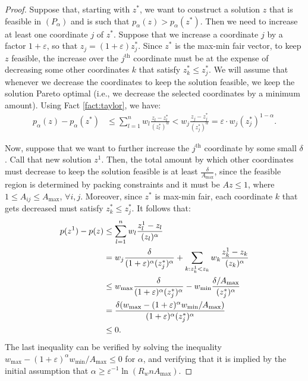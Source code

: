 \documentclass[11pt]{article}
\newcommand{\wratio}{R_w}
\begin{document}
\begin{proof}
Suppose that, starting with $z^*$, we want to construct a solution $z$ that is feasible in $(P_\alpha)$ and is such that $p_\alpha(z) > p_\alpha(z^*)$. Then we need to increase at least one coordinate $j$ of $z^*$. Suppose that we increase a coordinate $j$ by a factor $1+\varepsilon$, so that $z_j = (1+\varepsilon)z_j^*$. Since $z^*$ is the max-min fair vector, to keep $z$ feasible, the increase over the $j^{\text{th}}$ coordinate must be at the expense of decreasing some other coordinates $k$ that satisfy $z_k^* \leq z_j^*$. We will assume that whenever we decrease the coordinates to keep the solution feasible, we keep the solution Pareto optimal (i.e., we decrease the selected coordinates by a minimum amount). Using Fact \ref{fact:taylor}, we have:
\begin{align}
p_\alpha(z) - p_\alpha(z^*) &\leq \sum_{l=1}^n w_l\frac{z_l - z_l^*}{(z_l^*)^{\alpha}}< w_j\frac{z_j - z_j^*}{(z_j^*)^{\alpha}} = {\varepsilon}\cdot w_j(z_j^*)^{1-\alpha}. \label{eq:mmf-part-1}
\end{align}

Now, suppose that we want to further increase the $j^{\text{th}}$ coordinate by some small $\delta$. Call that new solution $z^1$. Then, the total amount by which other coordinates must decrease to keep the solution feasible is at least $\frac{\delta}{A_{\max}}$, since the feasible region is determined by packing constraints and it must be $Az\leq 1$, where $1\leq A_{ij}\leq A_{\max}$, $\forall i, j$. Moreover, since $z^*$ is max-min fair, each coordinate $k$ that gets decreased must satisfy $z_k^* \leq z_j^*$. It follows that:
\begin{align}
p(z^1) - p(z)&\leq \sum_{l=1}^n w_l\frac{z_l^1 - z_l}{(z_l)^{\alpha}}\notag\\
&= w_j \frac{\delta}{(1+\varepsilon)^{\alpha}(z_j^*)^{\alpha}} + \sum_{k: z_k^1 < z_k} w_k\frac{z_k^1 - z_k}{(z_k)^{\alpha}}\notag\\
&\leq w_{\max} \frac{\delta}{(1+\varepsilon)^{\alpha}(z_j^*)^{\alpha}} - w_{\min} \frac{\delta/A_{\max}}{(z_j^*)^{\alpha}}\notag\\
&= \frac{\delta(w_{\max} - (1+\varepsilon)^{\alpha}w_{\min}/A_{\max})}{(1+\varepsilon)^{\alpha}(z_j^*)^{\alpha}}\notag\\
&\leq 0. \label{eq:mmf-part-2}
\end{align}
The last inequality can be verified by solving the inequality $w_{\max} - (1+\varepsilon)^{\alpha}w_{\min}/A_{\max}\leq 0$ for $\alpha$, and verifying that it is implied by the initial assumption that $\alpha \geq \varepsilon^{-1}\ln(\wratio n A_{\max})$.


\end{proof}
\end{document}
